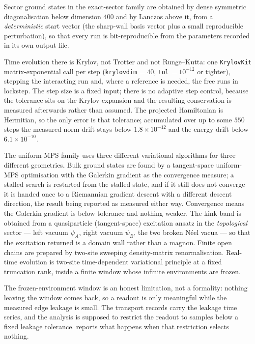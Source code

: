 Sector ground states in the exact-sector family are obtained by dense
symmetric diagonalisation below dimension $400$ and by Lanczos above it, from
a \emph{deterministic} start vector (the sharp-wall basis vector plus a small
reproducible perturbation), so that every run is bit-reproducible from the
parameters recorded in its own output file.

Time evolution there is Krylov, not Trotter and not Runge--Kutta: one
\texttt{KrylovKit} matrix-exponential call per step (\texttt{krylovdim}$\,=40$,
\texttt{tol}$\,=10^{-12}$ or tighter), stepping the interacting run and, where
a reference is needed, the free runs in lockstep. The step size is a fixed
input; there is no adaptive step control, because the tolerance sits on the
Krylov expansion and the resulting conservation is measured afterwards rather
than assumed. The projected Hamiltonian is Hermitian, so the only error is that
tolerance; accumulated over up to some $550$ steps the measured norm drift
stays below $1.8\times10^{-12}$ and the energy drift below $6.1\times10^{-10}$.

The uniform-MPS family uses three different variational algorithms for three
different geometries. Bulk ground states are found by a tangent-space
uniform-MPS optimisation with the Galerkin gradient as the convergence
measure; a stalled search is restarted from the stalled state, and if it still
does not converge it is handed once to a Riemannian gradient descent with a
different descent direction, the result being reported as measured either way.
Convergence means the Galerkin gradient is below tolerance and nothing weaker.
The kink band is obtained from a quasiparticle (tangent-space) excitation
ansatz in the \emph{topological} sector --- left vacuum $\psi_A$, right vacuum
$\psi_B$, the two broken N\'eel vacua --- so that the excitation returned is a
domain wall rather than a magnon. Finite open chains are prepared by two-site
sweeping density-matrix renormalisation. Real-time evolution is two-site
time-dependent variational principle at a fixed truncation rank, inside a
finite window whose infinite environments are frozen.

The frozen-environment window is an honest limitation, not a formality:
nothing leaving the window comes back, so a readout is only meaningful while
the measured edge leakage is small. The transport records carry the leakage
time series, and the analysis is supposed to restrict the readout to samples
below a fixed leakage tolerance.  reports what
happens when that restriction selects nothing.

